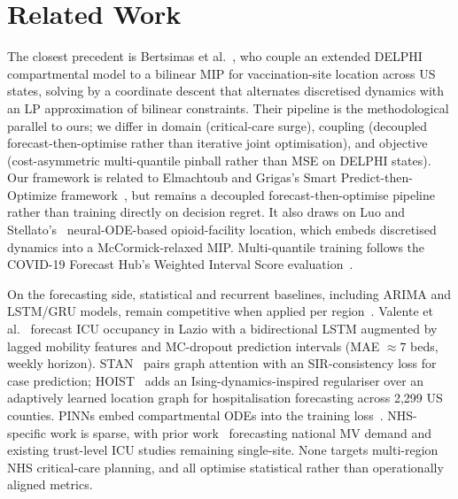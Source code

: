 \section{Related Work}\label{sec:related_work}

The closest precedent is Bertsimas et al.~\cite{bertsimas2022where}, who
couple an extended DELPHI compartmental model to a bilinear MIP for
vaccination-site location across US states, solving by a coordinate
descent that alternates discretised dynamics with an LP approximation
of bilinear constraints. Their pipeline is the methodological parallel
to ours; we differ in domain (critical-care surge), coupling
(decoupled forecast-then-optimise rather than iterative joint
optimisation), and objective (cost-asymmetric multi-quantile pinball
rather than MSE on DELPHI states). Our framework is related to
Elmachtoub and Grigas's Smart Predict-then-Optimize
framework~\cite{elmachtoub2022smart}, but remains a decoupled
forecast-then-optimise pipeline rather than training directly on
decision regret. It also draws on Luo and
Stellato's~\cite{luo2024equitable} neural-ODE-based opioid-facility
location, which embeds discretised dynamics into a McCormick-relaxed
MIP. Multi-quantile training follows the COVID-19 Forecast Hub's
Weighted Interval Score evaluation~\cite{bracher2021evaluating}.

On the forecasting side, statistical and recurrent baselines, including
ARIMA and LSTM/GRU models, remain
competitive when applied per region~\cite{ajao2024deep}. Valente et
al.~\cite{valente2022forecasting} forecast ICU occupancy in Lazio with
a bidirectional LSTM augmented by lagged mobility features and
MC-dropout prediction intervals (MAE $\approx 7$ beds, weekly horizon).
STAN~\cite{gao2021stan} pairs graph attention with an SIR-consistency
loss for case prediction; HOIST~\cite{gao2023hoist} adds an
Ising-dynamics-inspired regulariser over an adaptively learned location
graph for hospitalisation forecasting across 2{,}299 US counties. PINNs
embed compartmental ODEs into the training
loss~\cite{ajao2025hybrid,qian2025physics}. NHS-specific work is
sparse, with prior
work~\cite{ajao2024deep,ajao2025hybrid} forecasting national MV demand
and existing trust-level ICU studies remaining single-site. None
targets multi-region NHS critical-care planning, and all optimise
statistical rather than operationally aligned metrics.

